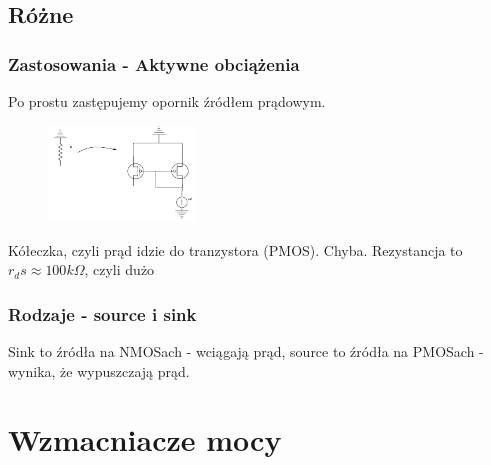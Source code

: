 \documentclass[10pt,a4paper]{article}
\begin{document}
\subsection{Różne}
\subsubsection{Zastosowania - Aktywne obciążenia}
Po prostu zastępujemy opornik źródłem prądowym.
\begin{figure}[H]
\centering
\includegraphics[width=0.35\textwidth]{lustroZast}
\end{figure}
Kółeczka, czyli prąd idzie do tranzystora (PMOS). Chyba. Rezystancja to $r_ds \approx 100k \Omega$, czyli dużo 

\subsubsection{Rodzaje - source i sink}
Sink to źródła na NMOSach - wciągają prąd, source to źródła na PMOSach - wynika, że wypuszczają prąd.

\section{Wzmacniacze mocy}
\end{document}
